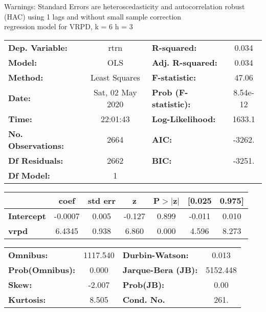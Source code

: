 Warnings: \newline
 [1] Standard Errors are heteroscedasticity and autocorrelation robust (HAC) using 1 lags and without small sample correction\\ 

regression model for VRPD, k = 6 h = 3\begin{center}
\begin{tabular}{lclc}
\toprule
\textbf{Dep. Variable:}    &       rtrn       & \textbf{  R-squared:         } &     0.034   \\
\textbf{Model:}            &       OLS        & \textbf{  Adj. R-squared:    } &     0.034   \\
\textbf{Method:}           &  Least Squares   & \textbf{  F-statistic:       } &     47.06   \\
\textbf{Date:}             & Sat, 02 May 2020 & \textbf{  Prob (F-statistic):} &  8.54e-12   \\
\textbf{Time:}             &     22:01:43     & \textbf{  Log-Likelihood:    } &    1633.1   \\
\textbf{No. Observations:} &        2664      & \textbf{  AIC:               } &    -3262.   \\
\textbf{Df Residuals:}     &        2662      & \textbf{  BIC:               } &    -3251.   \\
\textbf{Df Model:}         &           1      & \textbf{                     } &             \\
\bottomrule
\end{tabular}
\begin{tabular}{lcccccc}
                   & \textbf{coef} & \textbf{std err} & \textbf{z} & \textbf{P$> |$z$|$} & \textbf{[0.025} & \textbf{0.975]}  \\
\midrule
\textbf{Intercept} &      -0.0007  &        0.005     &    -0.127  &         0.899        &       -0.011    &        0.010     \\
\textbf{vrpd}      &       6.4345  &        0.938     &     6.860  &         0.000        &        4.596    &        8.273     \\
\bottomrule
\end{tabular}
\begin{tabular}{lclc}
\textbf{Omnibus:}       & 1117.540 & \textbf{  Durbin-Watson:     } &    0.013  \\
\textbf{Prob(Omnibus):} &   0.000  & \textbf{  Jarque-Bera (JB):  } & 5152.448  \\
\textbf{Skew:}          &  -2.007  & \textbf{  Prob(JB):          } &     0.00  \\
\textbf{Kurtosis:}      &   8.505  & \textbf{  Cond. No.          } &     261.  \\
\bottomrule
\end{tabular}
\end{center}

